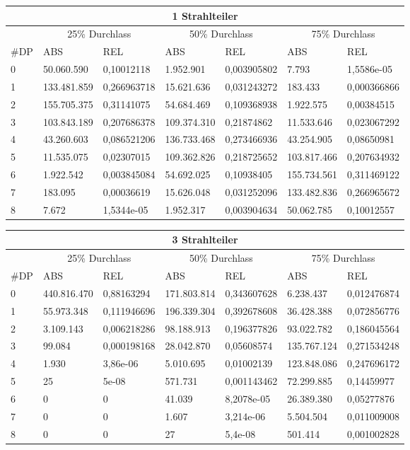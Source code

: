 \begin{tabular}{|l|l|l|l|l|l|l|}
	\hline
	\multicolumn{7}{|c|}{1 Strahlteiler} \\\hline
	&\multicolumn{2}{|c|}{25\% Durchlass}&\multicolumn{2}{c|}{50\% Durchlass}&\multicolumn{2}{c|}{75\% Durchlass}\\\hline
	\#DP & ABS & REL  & ABS & REL & ABS & REL \\\hline
	0&	50.060.590&		0,10012118&	1.952.901&		0,003905802&	7.793&1,5586e-05\\
	1&	133.481.859&	0,266963718&	15.621.636&		0,031243272&	183.433&0,000366866\\
	2&	155.705.375&	0,31141075&	54.684.469&		0,109368938&	1.922.575&0,00384515\\
	3&	103.843.189&	0,207686378&	109.374.310&	0,21874862&	11.533.646&0,023067292\\
	4&	43.260.603&		0,086521206&	136.733.468&	0,273466936&	43.254.905&0,08650981\\
	5&	11.535.075&		0,02307015&	109.362.826&	0,218725652&	103.817.466&0,207634932\\
	6&	1.922.542&		0,003845084&	54.692.025&		0,10938405&	155.734.561&0,311469122\\
	7&	183.095&		0,00036619&	15.626.048&		0,031252096&	133.482.836&0,266965672\\
	8&	7.672&		1,5344e-05&		1.952.317&		0,003904634&	50.062.785&0,10012557\\
	\hline
\end{tabular}

\begin{tabular}{|l|l|l|l|l|l|l|}
	\hline
	\multicolumn{7}{|c|}{3 Strahlteiler} \\\hline
	&\multicolumn{2}{|c|}{25\% Durchlass}&\multicolumn{2}{c|}{50\% Durchlass}&\multicolumn{2}{c|}{75\% Durchlass}\\\hline
	\#DP & ABS & REL  & ABS & REL & ABS & REL \\\hline
	0&440.816.470&0,88163294&171.803.814&0,343607628&6.238.437&0,012476874\\
	1&55.973.348&0,111946696&196.339.304&0,392678608&36.428.388&0,072856776\\
	2&3.109.143&0,006218286&98.188.913&0,196377826&93.022.782&0,186045564\\
	3&99.084&0,000198168&28.042.870&0,05608574&135.767.124&0,271534248\\
	4&1.930&3,86e-06&5.010.695&0,01002139&123.848.086&0,247696172\\
	5&25&5e-08&571.731&0,001143462&72.299.885&0,14459977\\
	6&0&0&41.039&8,2078e-05&26.389.380&0,05277876\\
	7&0&0&1.607&3,214e-06&5.504.504&0,011009008\\
	8&0&0&27&5,4e-08&501.414&0,001002828\\
	\hline
\end{tabular}

